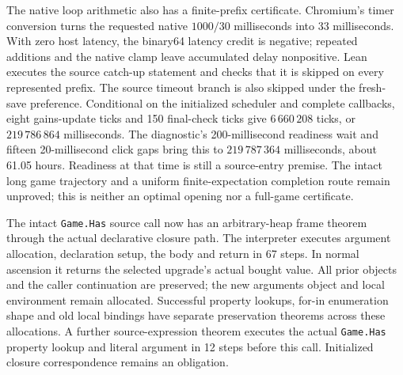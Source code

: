\documentclass[11pt,a4paper]{article}
\numberwithin{equation}{section}
\theoremstyle{definition}
\theoremstyle{remark}
\begin{document}
The native loop arithmetic also has a finite-prefix certificate. Chromium's timer conversion turns the requested native $1000/30$ milliseconds into 33 milliseconds. With zero host latency, the binary64 latency credit is negative; repeated additions and the native clamp leave accumulated delay nonpositive. Lean executes the source catch-up statement and checks that it is skipped on every represented prefix. The source timeout branch is also skipped under the fresh-save preference. Conditional on the initialized scheduler and complete callbacks, eight gains-update ticks and 150 final-check ticks give $6\,660\,208$ ticks, or $219\,786\,864$ milliseconds. The diagnostic's 200-millisecond readiness wait and fifteen 20-millisecond click gaps bring this to $219\,787\,364$ milliseconds, about 61.05 hours. Readiness at that time is still a source-entry premise. The intact long game trajectory and a uniform finite-expectation completion route remain unproved; this is neither an optimal opening nor a full-game certificate.

The intact \texttt{Game.Has} source call now has an arbitrary-heap frame theorem through the actual declarative closure path. The interpreter executes argument allocation, declaration setup, the body and return in 67 steps. In normal ascension it returns the selected upgrade's actual bought value. All prior objects and the caller continuation are preserved; the new arguments object and local environment remain allocated. Successful property lookups, for-in enumeration shape and old local bindings have separate preservation theorems across these allocations. A further source-expression theorem executes the actual \texttt{Game.Has} property lookup and literal argument in 12 steps before this call. Initialized closure correspondence remains an obligation.
\end{document}
